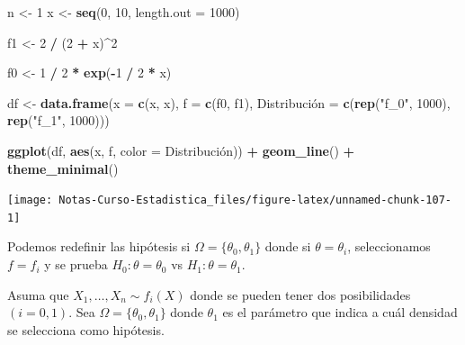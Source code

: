 \documentclass[
  12pt,
]{book}
\newenvironment{Shaded}{\begin{snugshade}}{\end{snugshade}}
\newcommand{\DataTypeTok}[1]{\textcolor[rgb]{0.13,0.29,0.53}{#1}}
\newcommand{\DecValTok}[1]{\textcolor[rgb]{0.00,0.00,0.81}{#1}}
\newcommand{\KeywordTok}[1]{\textcolor[rgb]{0.13,0.29,0.53}{\textbf{#1}}}
\newcommand{\NormalTok}[1]{#1}
\newcommand{\OperatorTok}[1]{\textcolor[rgb]{0.81,0.36,0.00}{\textbf{#1}}}
\newcommand{\StringTok}[1]{\textcolor[rgb]{0.31,0.60,0.02}{#1}}
\begin{document}
\begin{Shaded}
\begin{Highlighting}[]
\NormalTok{n \textless{}{-}}\StringTok{ }\DecValTok{1}
\NormalTok{x \textless{}{-}}\StringTok{ }\KeywordTok{seq}\NormalTok{(}\DecValTok{0}\NormalTok{, }\DecValTok{10}\NormalTok{, }\DataTypeTok{length.out =} \DecValTok{1000}\NormalTok{)}

\NormalTok{f1 \textless{}{-}}\StringTok{  }\DecValTok{2} \OperatorTok{/}\StringTok{ }\NormalTok{(}\DecValTok{2} \OperatorTok{+}\StringTok{ }\NormalTok{x)}\OperatorTok{\^{}}\DecValTok{2}

\NormalTok{f0 \textless{}{-}}\StringTok{ }\DecValTok{1} \OperatorTok{/}\StringTok{ }\DecValTok{2} \OperatorTok{*}\StringTok{ }\KeywordTok{exp}\NormalTok{(}\OperatorTok{{-}}\DecValTok{1} \OperatorTok{/}\StringTok{ }\DecValTok{2} \OperatorTok{*}\StringTok{ }\NormalTok{x)}

\NormalTok{df \textless{}{-}}\StringTok{ }\KeywordTok{data.frame}\NormalTok{(}\DataTypeTok{x =} \KeywordTok{c}\NormalTok{(x, x), }\DataTypeTok{f =} \KeywordTok{c}\NormalTok{(f0, f1), }\StringTok{\textasciigrave{}}\DataTypeTok{Distribución}\StringTok{\textasciigrave{}}\NormalTok{ =}\StringTok{ }\KeywordTok{c}\NormalTok{(}\KeywordTok{rep}\NormalTok{(}\StringTok{"f\_0"}\NormalTok{, }\DecValTok{1000}\NormalTok{), }\KeywordTok{rep}\NormalTok{(}\StringTok{"f\_1"}\NormalTok{, }\DecValTok{1000}\NormalTok{)))}

\KeywordTok{ggplot}\NormalTok{(df, }\KeywordTok{aes}\NormalTok{(x, f, }\DataTypeTok{color =} \StringTok{\textasciigrave{}}\DataTypeTok{Distribución}\StringTok{\textasciigrave{}}\NormalTok{)) }\OperatorTok{+}
\StringTok{  }\KeywordTok{geom\_line}\NormalTok{() }\OperatorTok{+}
\StringTok{  }\KeywordTok{theme\_minimal}\NormalTok{()}
\end{Highlighting}
\end{Shaded}

\begin{center}\texttt{[image: Notas-Curso-Estadistica\_files/figure-latex/unnamed-chunk-107-1]} \end{center}

Podemos redefinir las hipótesis si \(\Omega=\{\theta_0,\theta_1\}\) donde si
\(\theta = \theta_i\), seleccionamos \(f = f_i\) y se prueba \(H_0: \theta=\theta_0\)
vs \(H_1:\theta=\theta_1\).

Asuma que \(X_1,\dots,X_n\sim f_i(X)\) donde se pueden tener dos posibilidades
\((i=0,1)\). Sea \(\Omega =\{\theta_0,\theta_1\}\) donde \(\theta_1\) es el parámetro
que indica a cuál densidad se selecciona como hipótesis.
\end{document}
